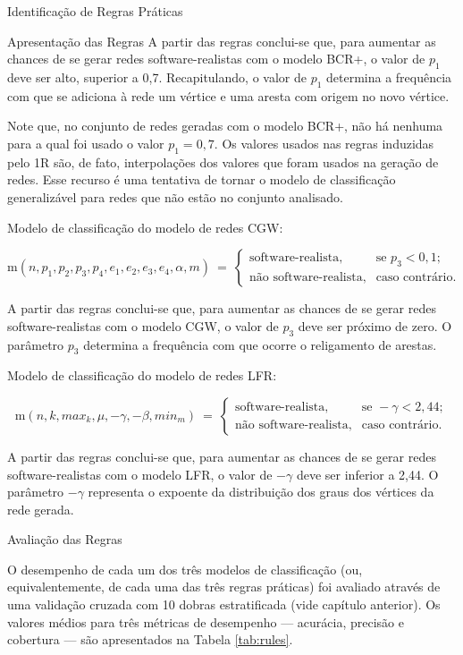 \begin{section}{Identificação de Regras Práticas}
\begin{subsection}{Apresentação das Regras}
	A partir das regras conclui-se que, para aumentar as chances de se gerar redes software-realistas com o modelo BCR+, o valor de $p_1$ deve ser alto, superior a 0,7. Recapitulando, o valor de $p_1$ determina a frequência com que se adiciona à rede um vértice e uma aresta com origem no novo vértice.
	
	Note que, no conjunto de redes geradas com o modelo BCR+, não há nenhuma para a qual foi usado o valor $p_1 = 0,7$. Os valores usados nas regras induzidas pelo 1R são, de fato, interpolações dos valores que foram usados na geração de redes. Esse recurso é uma tentativa de tornar o modelo de classificação generalizável para redes que não estão no conjunto analisado.
	
	Modelo de classificação do modelo de redes CGW:
	
	$$
	\mathrm{m}(n, p_1, p_2, p_3, p_4, e_1, e_2, e_3, e_4, \alpha, m) ~=~
	\left\{
	\begin{array}{cl}
	\mbox{software-realista,} & \mbox{se } p_3 < 0,1; \\
	\mbox{não software-realista,} & \mbox{caso contrário.}
	\end{array}
	\right.
	$$
	
		A partir das regras conclui-se que, para aumentar as chances de se gerar redes software-realistas com o modelo CGW, o valor de $p_3$ deve ser próximo de zero. O parâmetro $p_3$ determina a frequência com que ocorre o religamento de arestas. 
	
	Modelo de classificação do modelo de redes LFR:

	$$
	\mathrm{m}(n, k, max_k, \mu, -\gamma, -\beta, min_m) ~=~
	\left\{
	\begin{array}{cl}
	\mbox{software-realista,} & \mbox{se } -\gamma < 2,44; \\
	\mbox{não software-realista,} & \mbox{caso contrário.}
	\end{array}
	\right.
	$$
	
	A partir das regras conclui-se que, para aumentar as chances de se gerar redes software-realistas com o modelo LFR, o valor de $-\gamma$ deve ser inferior a 2,44. O parâmetro $-\gamma$ representa o expoente da distribuição dos graus dos vértices da rede gerada.
	
\end{subsection}
	
\begin{subsection}{Avaliação das Regras}
	
\end{subsection}
	O desempenho de cada um dos três modelos de classificação (ou, equivalentemente, de cada uma das três regras práticas) foi avaliado através de uma validação cruzada com 10 dobras estratificada (vide capítulo anterior). Os valores médios para três métricas de desempenho --- acurácia, precisão e cobertura --- são apresentados na Tabela \ref{tab:rules}.
	

\end{section}
